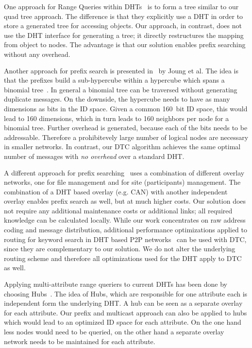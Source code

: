\documentclass[fleqn,12pt,twoside]{article}
\begin{document}
One approach for Range Queries within DHTs~\cite{data-prefix} is to form a tree similar to
our quad tree approach. The difference is that they explicitly use a
DHT in order to store a generated tree for accessing objects. Our
approach, in contrast, does not use the DHT interface for generating a
tree; it directly restructures the mapping from object to nodes. The
advantage is that our solution enables prefix searching without any
overhead.

Another approach for prefix search is presented
in~\cite{10.1109/P2P.2006.24} by Joung et al. The idea is that the 
prefixes build a sub-hypercube within a hypercube which spans a
binomial tree~\cite{10.1109/ICDCS.2005.44}. In general a binomial tree
can be traversed without generating duplicate messages. On the
downside, the hypercube needs to have as many dimensions as bits in
the ID space. Given a common 160~bit ID space, this would lead to 160
dimensions, which in turn leads to 160 neighbors per node for a
binomial tree. Further overhead is generated, because each of the
 bits needs to be addressable. Therefore a prohibitevely large
number of logical nodes are necessary in smaller networks. In
contrast, our DTC algorithm achieves the same optimal number of
messages with \emph{no overhead} over a standard DHT.

A different approach for prefix searching~\cite{872053}  uses
a combination of different overlay networks, one  for file
management and for site (participants) management.  The
combination of a DHT based overlay (e.g. CAN) with another independent
overlay enables prefix search as well, but at much higher costs. Our
solution does not require any additional maintenance costs or
additional links; all required knowledge can be calculated locally.
While our work concentrates on raw address coding and message
distribution, additional performance optimizations applied to routing
for keyword search in DHT based P2P
networks~\cite{reynolds2003epp,gnawali2002kss} can be used with DTC,
since they are complementary to our solution. We do not alter the
underlying routing scheme and therefore all optimizations used for the
DHT apply to DTC as well.

Applying multi-attribute range queriers to current DHTs has been done by choosing Hubs~\cite{bharambe2004mss}.
The idea of Hubs, which are responsible for one attribute each is independent form the underlying DHT. A hub
can be seen as a separate overlay for each attribute. Our prefix and multicast approach can also be applied to hubs which would lead 
to an optimized ID space for each attribute. On the one hand less nodes would need to be queried, on the other hand a separate overlay network needs to be maintained for each attribute.
\end{document}
